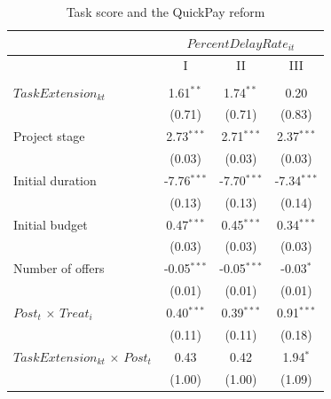 \documentclass[
]{article}
\begin{document}
\begin{table}[htbp]
   \caption{Task score and the QuickPay reform}
   \centering
   \small
   \begin{tabular}{lccc}
      \toprule
      \midrule  & \multicolumn{3}{c}{$PercentDelayRate_{it}$}\\
      \midrule  & I & II & III\\
      \midrule \\
      $TaskExtension_{kt}$                                        & 1.61$^{**}$   & 1.74$^{**}$   & 0.20\\   
                                                                  & (0.71)        & (0.71)        & (0.83)\\   
      Project stage                                               & 2.73$^{***}$  & 2.71$^{***}$  & 2.37$^{***}$\\   
                                                                  & (0.03)        & (0.03)        & (0.03)\\   
      Initial duration                                            & -7.76$^{***}$ & -7.70$^{***}$ & -7.34$^{***}$\\   
                                                                  & (0.13)        & (0.13)        & (0.14)\\   
      Initial budget                                              & 0.47$^{***}$  & 0.45$^{***}$  & 0.34$^{***}$\\   
                                                                  & (0.03)        & (0.03)        & (0.03)\\   
      Number of offers                                            & -0.05$^{***}$ & -0.05$^{***}$ & -0.03$^{*}$\\   
                                                                  & (0.01)        & (0.01)        & (0.01)\\   
      $Post_t$ $\times$ $Treat_i$                                 & 0.40$^{***}$  & 0.39$^{***}$  & 0.91$^{***}$\\   
                                                                  & (0.11)        & (0.11)        & (0.18)\\   
      $TaskExtension_{kt}$ $\times$ $Post_t$                      & 0.43          & 0.42          & 1.94$^{*}$\\   
                                                                  & (1.00)        & (1.00)        & (1.09)\\   

\end{tabular}
\end{table}
\end{document}
